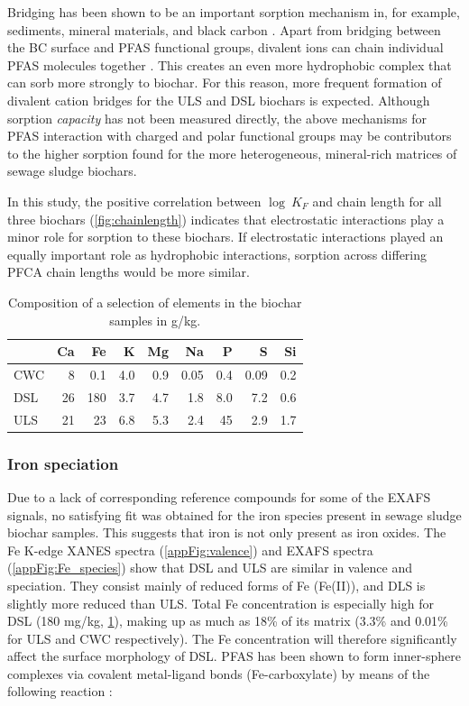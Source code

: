 Bridging has been shown to be an important sorption mechanism in, for example, sediments, mineral materials, and black carbon \citep{higgins2006sorption}. Apart from bridging between the BC surface and PFAS functional groups, divalent ions can chain individual PFAS molecules together \citep{wang2011}. This creates an even more hydrophobic complex that can sorb more strongly to biochar. For this reason, more frequent formation of divalent cation bridges for the ULS and DSL biochars is expected. Although sorption \textit{capacity} has not been measured directly, the above mechanisms for PFAS interaction with charged and polar functional groups may be contributors to the higher sorption found for the more heterogeneous, mineral-rich matrices of sewage sludge biochars.

In this study, the positive correlation between $\log~K_F$ and chain length for all three biochars (\cref{fig:chainlength}) indicates that electrostatic interactions play a minor role for sorption to these biochars. If electrostatic interactions played an equally important role as hydrophobic interactions, sorption across differing PFCA chain lengths would be more similar. 

\begin{table}
\centering
\caption{Composition of a selection of elements in the biochar samples in g/kg.}
\label{tab:BC_mainElements}
\begin{tabular}{lrrrrrrrr} \toprule
 & Ca & Fe & K & Mg & Na & P & S & Si \\ \midrule
CWC & 8 & 0.1 & 4.0 & 0.9 & 0.05 & 0.4 & 0.09 & 0.2 \\
DSL & 26 & 180 & 3.7 & 4.7 & 1.8 & 8.0 & 7.2 & 0.6 \\
ULS & 21 & 23 & 6.8 & 5.3 & 2.4 & 45 & 2.9 & 1.7 \\ \bottomrule
\end{tabular}
\end{table}

\subsubsection{Iron speciation\label{sec:Fe}}
Due to a lack of corresponding reference compounds for some of the EXAFS signals, no satisfying fit was obtained for the iron species present in sewage sludge biochar samples. This suggests that iron is not only present as iron oxides. The Fe K-edge XANES spectra (\cref{appFig:valence}) and EXAFS spectra (\cref{appFig:Fe_species}) show that DSL and ULS are similar in valence and speciation. They consist mainly of reduced forms of Fe (Fe(II)), and DLS is slightly more reduced than ULS. Total Fe concentration is especially high for DSL (180 mg/kg, \cref{tab:BC_mainElements}), making up as much as 18\% of its matrix (3.3\% and 0.01\% for ULS and CWC respectively). The Fe concentration will therefore significantly affect the surface morphology of DSL. PFAS has been shown to form inner-sphere complexes via covalent metal-ligand bonds (Fe-carboxylate) by means of the following reaction \citep{du2014adsorption}:

